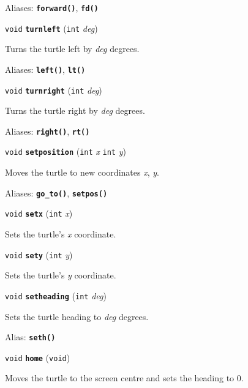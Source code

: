 \documentclass[a4paper,11pt]{article}
\newcommand{\V}{\texttt{void}}      %
\newcommand{\I}{\texttt{int}}       %
\newcommand{\func}[1]{\textbf{\texttt{#1}}}  %
\newcommand{\A}[1]{\emph{#1}}       %
\newenvironment{bgi}
{ %
  \begin{snugshade}
}
{ %
  \end{snugshade}
}
\begin{document}
Aliases: \func{forward()}, \func{fd()}


\begin{bgi}
\V{} \func{turnleft} (\I{} \A{deg})
\end{bgi}

Turns the turtle left by \A{deg} degrees.

Aliases: \func{left()}, \func{lt()}


\begin{bgi}
\V{} \func{turnright} (\I{} \A{deg})
\end{bgi}

Turns the turtle right by \A{deg} degrees.

Aliases: \func{right()}, \func{rt()}


\begin{bgi}
\V{} \func{setposition} (\I{} \A{x} \I{} \A{y})
\end{bgi}

Moves the turtle to new coordinates \A{x}, \A{y}.

Aliases: \func{go\_to()}, \func{setpos()}


\begin{bgi}
\V{} \func{setx} (\I{} \A{x})
\end{bgi}

Sets the turtle's \A{x} coordinate.


\begin{bgi}
\V{} \func{sety} (\I{} \A{y})
\end{bgi}

Sets the turtle's \A{y} coordinate.


\begin{bgi}
\V{} \func{setheading} (\I{} \A{deg})
\end{bgi}

Sets the turtle heading to \A{deg} degrees.

Alias: \func{seth()}


\begin{bgi}
\V{} \func{home} (\V{})
\end{bgi}

Moves the turtle to the screen centre and sets the heading to 0.

\end{document}
